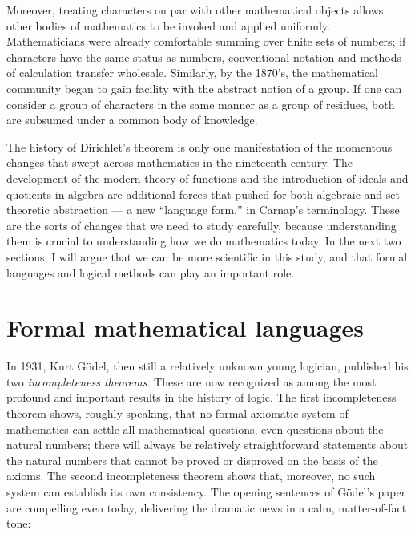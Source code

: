 \documentclass[11pt]{article}
\begin{document}
Moreover, treating characters on par with other mathematical objects allows other bodies of mathematics to be invoked and applied uniformly. Mathematicians were already comfortable summing over finite sets of numbers; if characters have the same status as numbers, conventional notation and methods of calculation transfer wholesale. Similarly, by the 1870's, the mathematical community began to gain facility with the abstract notion of a group. If one can consider a group of characters in the same manner as a group of residues, both are subsumed under a common body of knowledge.

The history of Dirichlet's theorem is only one manifestation of the momentous changes that swept across mathematics in the nineteenth century. The development of the modern theory of functions and the introduction of ideals and quotients in algebra are additional forces that pushed for both algebraic and set-theoretic abstraction --- a new ``language form,'' in Carnap's terminology. These are the sorts of changes that we need to study carefully, because understanding them is crucial to understanding how we do mathematics today. In the next two sections, I will argue that we can be more scientific in this study, and that formal languages and logical methods can play an important role.

\section{Formal mathematical languages}
\label{section:formal}

In 1931, Kurt G\"odel, then still a relatively unknown young logician, published his two \emph{incompleteness theorems}. These are now recognized as among the most profound and important results in the history of logic. The first incompleteness theorem shows, roughly speaking, that no formal axiomatic system of mathematics can settle all mathematical questions, even questions about the natural numbers; there will always be relatively straightforward statements about the natural numbers that cannot be proved or disproved on the basis of the axioms. The second incompleteness theorem shows that, moreover, no such system can establish its own consistency. The opening sentences of G\"odel's paper are compelling even today, delivering the dramatic news in a calm, matter-of-fact tone:
\end{document}

